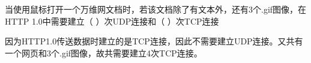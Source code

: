 \question 当使用鼠标打开一个万维网文档时，若该文档除了有文本外，还有3个.gif图像，在HTTP
1.0中需要建立（ ）次UDP连接和（ ）次TCP连接
\par{}
\begin{solution}因为HTTP1.0传送数据时建立的是TCP连接，因此不需要建立UDP连接。又共有一个网页和3个.gif图像，故共需要建立4次TCP连接。
\end{solution}
